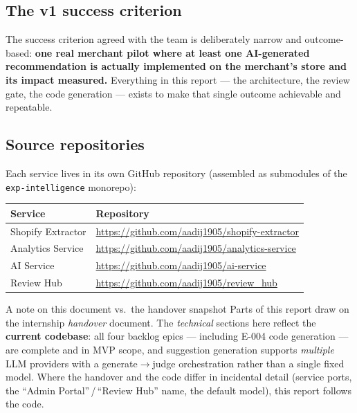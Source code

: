 \documentclass[11pt,a4paper]{article}
\begin{document}
\subsection{The v1 success criterion}

The success criterion agreed with the team is deliberately narrow and
outcome-based: \textbf{one real merchant pilot where at least one AI-generated
recommendation is actually implemented on the merchant's store and its impact
measured.} Everything in this report --- the architecture, the review gate, the
code generation --- exists to make that single outcome achievable and
repeatable.

\subsection{Source repositories}

Each service lives in its own GitHub repository (assembled as submodules of the
\texttt{exp-intelligence} monorepo):

\begin{center}
\begin{tabularx}{\textwidth}{@{}l Y@{}}
\toprule
\textbf{Service} & \textbf{Repository}\\
\midrule
Shopify Extractor & \url{https://github.com/aadij1905/shopify-extractor}\\
Analytics Service & \url{https://github.com/aadij1905/analytics-service}\\
AI Service & \url{https://github.com/aadij1905/ai-service}\\
Review Hub & \url{https://github.com/aadij1905/review_hub}\\
\bottomrule
\end{tabularx}
\end{center}

\begin{keybox}{A note on this document vs.\ the handover snapshot}
Parts of this report draw on the internship \emph{handover} document. The
\emph{technical} sections here reflect the \textbf{current codebase}: all four
backlog epics --- including E-004 code generation --- are complete and in MVP
scope, and suggestion generation supports \emph{multiple} LLM providers with a
generate$\rightarrow$judge orchestration rather than a single fixed model.
Where the handover and the code differ in incidental detail (service ports, the
``Admin Portal''\,/\,``Review Hub'' name, the default model), this report
follows the code.
\end{keybox}
\end{document}
